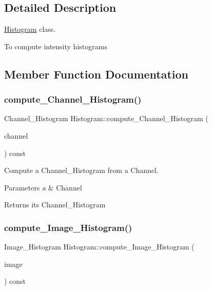 \subsection{Detailed Description}
\hyperlink{class_histogram}{Histogram} class. 

To compute intensity histograms 

\subsection{Member Function Documentation}
\mbox{\label{class_histogram_aa842a6d1281967505d3be94ac5eec727}} 
\subsubsection{\texorpdfstring{compute\+\_\+\+Channel\+\_\+\+Histogram()}{compute\_Channel\_Histogram()}}
{\footnotesize\ttfamily Channel\+\_\+\+Histogram Histogram\+::compute\+\_\+\+Channel\+\_\+\+Histogram (\begin{DoxyParamCaption}\item[{Channel}]{channel }\end{DoxyParamCaption}) const}



Compute a Channel\+\_\+\+Histogram from a Channel. 


\begin{DoxyParams}{Parameters}
{\em a} & Channel \\
\hline
\end{DoxyParams}
\begin{DoxyReturn}{Returns}
its Channel\+\_\+\+Histogram 
\end{DoxyReturn}
\mbox{\label{class_histogram_aa1c0308f30b7dcdc5305ece5bc39a0ba}} 
\subsubsection{\texorpdfstring{compute\+\_\+\+Image\+\_\+\+Histogram()}{compute\_Image\_Histogram()}}
{\footnotesize\ttfamily Image\+\_\+\+Histogram Histogram\+::compute\+\_\+\+Image\+\_\+\+Histogram (\begin{DoxyParamCaption}\item[{R\+G\+B\+Image}]{image }\end{DoxyParamCaption}) const}



